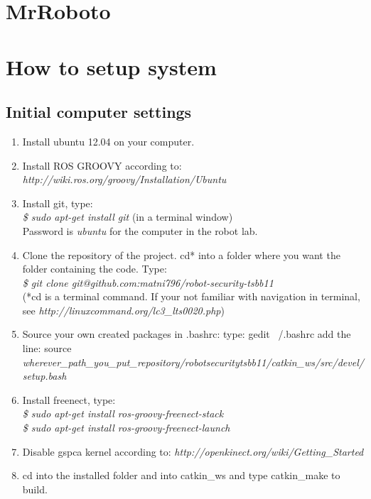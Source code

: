 \documentclass[10pt,a4paper]{article}
\begin{document}
\section*{MrRoboto}

\section{How to setup system}

\subsection{Initial computer settings}

\begin{enumerate}
\item Install ubuntu 12.04 on your computer.
\item Install ROS GROOVY according to: \textit{http://wiki.ros.org/groovy/Installation/Ubuntu}
\item Install git, type:\\
\textit{
\$ sudo apt-get install git} (in a terminal window)\\
Password is \textit{ubuntu} for the computer in the robot lab.
\item Clone the repository of the project.
cd* into a folder where you want the folder containing the code.
Type:\\
\textit{\$ git clone git@github.com:matni796/robot-security-tsbb11}\\
(*cd is a terminal command. If your not familiar with navigation in terminal, see \textit{http://linuxcommand.org/lc3\_lts0020.php})

\item Source your own created packages in .bashrc:
	type: gedit ~/.bashrc
add the line:
source \textit{wherever\_path\_you\_put\_repository/robot\-security\-tsbb11/catkin\_ws/src/devel/setup.bash}

\item Install freenect, type: \\
\textit{
\$ sudo apt-get install ros-groovy-freenect-stack\\
\$ sudo apt-get install ros-groovy-freenect-launch
}
\item Disable gspca kernel according to:
	\textit{http://openkinect.org/wiki/Getting\_Started}


\item cd into the installed folder and into catkin\_ws and type catkin\_make to build.
\end{enumerate}
\end{document}
